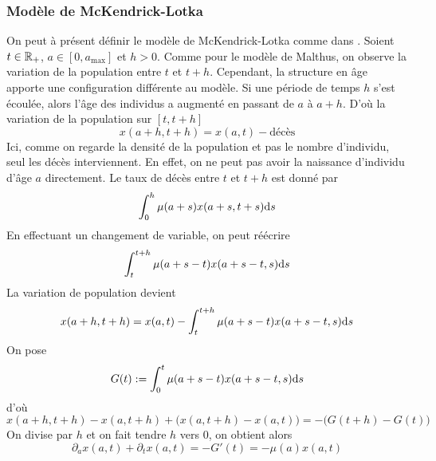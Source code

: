 \subsubsection{Modèle de McKendrick-Lotka}
On peut à présent définir le modèle de McKendrick-Lotka comme dans \cite{Iannelli2005}. Soient $t \in \mathbb{R}_+$, $a \in [0,a_{\max}]$ et $h>0$. Comme pour le modèle de Malthus, on observe la variation de la population entre $t$ et $t+h$. Cependant, la structure en âge apporte une configuration différente au modèle. Si une période de temps $h$ s'est écoulée, alors l'âge des individus a augmenté en passant de $a$ à $a+h$. D'où la variation de la population sur $[t,t+h]$
\begin{equation*}
    x(a+h,t+h) = x(a,t) - \text{décès}
\end{equation*}
Ici, comme on regarde la densité de la population et pas le nombre d'individu, seul les décès interviennent. En effet, on ne peut pas avoir la naissance d'individu d'âge $a$ directement. Le taux de décès entre $t$ et $t+h$ est donné par
\begin{equation*}
    \int_0^{h}\mu(a+s)x(a+s,t+s)\mathrm{d} s
\end{equation*}
En effectuant un changement de variable, on peut réécrire 
\begin{equation*}
    \int_t^{t+h}\mu(a+s-t)x(a+s-t,s)\mathrm{d} s
\end{equation*}
La variation de population devient 
\begin{equation*}
    x(a+h,t+h) = x(a,t) - \int_t^{t+h}\mu(a+s-t)x(a+s-t,s)\mathrm{d} s
\end{equation*}
On pose 
\begin{equation*}
    G(t) := \int_0^{t}\mu(a+s-t)x(a+s-t,s)\mathrm{d} s
\end{equation*}
d'où
\begin{equation*}
    x(a+h,t+h)-x(a,t+h)+\big(x(a,t+h) - x(a,t)\big) = - \big(G(t+h)-G(t)\big)
\end{equation*}
On divise par $h$ et on fait tendre $h$ vers $0$, on obtient alors 
\begin{equation*}
    \partial_ax(a,t)+\partial_tx(a,t) = -G'(t) = -\mu(a)x(a,t)
\end{equation*}

